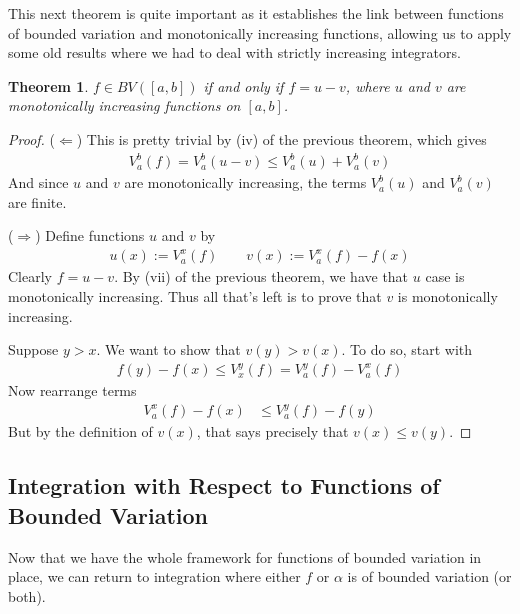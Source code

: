 \documentclass[12pt]{article}
\numberwithin{equation}{section} %
\theoremstyle{plain}
\newtheorem{thm}{Theorem}[section]
\theoremstyle{definition}
\theoremstyle{remark}
\begin{document}
\clearpage

This next theorem is quite important as it establishes the link between
functions of bounded variation and monotonically increasing functions,
allowing us to apply some old results where we had to deal with strictly
increasing integrators.

\begin{thm}
\label{monot}
$f\in BV([a,b])$ if and only if $f = u-v$, where $u$ and $v$ are
monotonically increasing functions on $[a,b]$.
\end{thm}
\begin{proof}
($\Leftarrow$)
This is pretty trivial by (iv) of the previous theorem, which gives
\begin{align*}
  V_a^b(f) = V_a^b(u-v) \leq V_a^b(u) + V_a^b(v)
\end{align*}
And since $u$ and $v$ are monotonically increasing, the terms $V_a^b(u)$
and $V_a^b(v)$ are finite.

($\Rightarrow$)
Define functions $u$ and $v$ by
\begin{align*}
  u(x) := V_a^x(f)
  \qquad
  v(x):=V_a^x(f) - f(x)
\end{align*}
Clearly $f = u-v$.
By (vii) of the previous theorem,
we have that $u$ case is monotonically increasing.
Thus all that's left is to prove that $v$ is monotonically
increasing.

Suppose $y>x$. We want to show that $v(y) > v(x)$.
To do so, start with
\begin{align*}
    f(y) - f(x) \leq V_x^y(f)
    = V_a^y(f) - V_a^x(f)
\end{align*}
Now rearrange terms
\begin{align*}
    V_a^x(f) - f(x) &\leq V_a^y(f) - f(y)
\end{align*}
But by the definition of $v(x)$, that says precisely that $v(x)\leq
v(y)$.
\end{proof}

\clearpage
\subsection{Integration with Respect to Functions of Bounded Variation}

Now that we have the whole framework for functions of bounded variation
in place, we can return to integration where either $f$ or $\alpha$ is
of bounded variation (or both).
\end{document}

